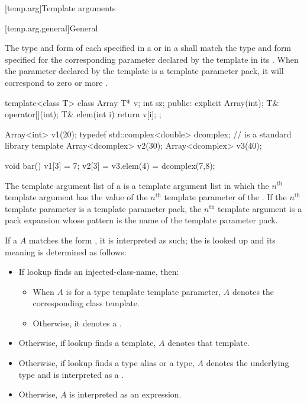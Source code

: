 [temp.arg]{Template arguments}

[temp.arg.general]{General}

\pnum
{}%
The type and form of each  specified
in a  or
in a 
shall match the type and form specified for the corresponding
parameter declared by the template in its
.
When the parameter declared by the template is a template
parameter pack, it will correspond to zero or more
.
\begin{example}
\begin{codeblock}
template<class T> class Array {
  T* v;
  int sz;
public:
  explicit Array(int);
  T& operator[](int);
  T& elem(int i) { return v[i]; }
};

Array<int> v1(20);
typedef std::complex<double> dcomplex;  //  is a standard library template
Array<dcomplex> v2(30);
Array<dcomplex> v3(40);

void bar() {
  v1[3] = 7;
  v2[3] = v3.elem(4) = dcomplex(7,8);
}
\end{codeblock}
\end{example}

\pnum
The template argument list of a  is
a template argument list in which the $n^\text{th}$ template argument
has the value of
the $n^\text{th}$ template parameter of the .
If the $n^\text{th}$ template parameter is
a template parameter pack,
the $n^\text{th}$ template argument is a pack expansion
whose pattern is the name of the template parameter pack.

\pnum
If a  $A$
matches the form ,
it is interpreted as such;
the  is looked up
and its meaning is determined as follows:
\begin{itemize}
\item
If lookup finds an injected-class-name, then:
\begin{itemize}
\item
When $A$ is for a type template template parameter,
$A$ denotes the corresponding class template.
\item
Otherwise, it denotes a .
\end{itemize}
\item
Otherwise, if lookup finds a template,
$A$ denotes that template.
\item
Otherwise, if lookup finds a type alias or a type,
$A$ denotes the underlying type and is interpreted as a .
\item
Otherwise, $A$ is interpreted as an expression.
\end{itemize}

